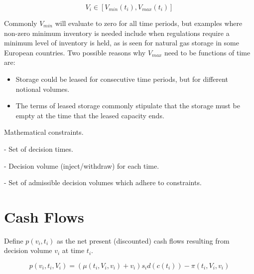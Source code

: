 \documentclass{article}
\begin{document}
\begin{equation}
    V_i \in [V_{min}(t_i), V_{max}(t_i)]
\end{equation}

Commonly $V_{min}$ will evaluate to zero for all time periods, but examples
where non-zero minimum inventory is needed include when regulations require a minimum
level of inventory is held, as is seen for natural gas storage in some European countries.
Two possible reasons why $V_{max}$ need to be functions of time are:
\begin{itemize}
    \item Storage could be leased for consecutive time periods, but for different notional
    volumes.
    \item The terms of leased storage commonly stipulate that the storage must be empty
    at the time that the leased capacity ends.
\end{itemize}


Mathematical constraints.

- Set of decision times.

- Decision volume (inject/withdraw) for each time.

- Set of admissible decision volumes which adhere to constraints.


\section{Cash Flows}
Define $p(v_i, t_i)$ as the net present (discounted) cash flows resulting from decision
volume $v_i$ at time $t_i$.

\begin{equation}
    p(v_i, t_i, V_i) = (\mu(t_i, V_i, v_i) + v_i) s_i d(c(t_i)) - \pi(t_i, V_i, v_i)
\end{equation}
\end{document}
